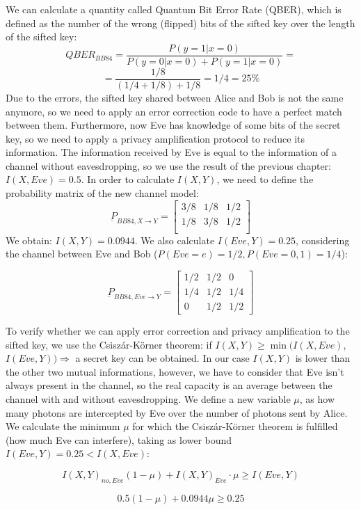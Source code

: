 \documentclass[journal, letterpaper]{IEEEtran}
\begin{document}
We can calculate a quantity called Quantum Bit Error Rate (QBER), which is defined as the number of the wrong (flipped) bits of the sifted key over the length of the sifted key: 
\[QBER_{BB84} = \frac{P(y=1|x=0)}{P(y=0|x=0)+P(y=1|x=0)}=\]
\[= \frac{1/8}{(1/4+1/8)+1/8} = 1/4 = 25\%\]
Due to the errors, the sifted key shared between Alice and Bob is not the same anymore, so we need to apply an error correction code to have a perfect match between them. Furthermore, now Eve has knowledge of some bits of the secret key, so we need to apply a privacy amplification protocol to reduce its information. The information received by Eve is equal to the information of a channel without eavesdropping, so we use the result of the previous chapter: $I(X,Eve) = 0.5$. In order to calculate $I(X,Y)$, we need to define the probability matrix of the new channel model: 
\[\underbar{P}_{BB84,X\rightarrow Y} = \begin{bmatrix}
    3/8 & 1/8 & 1/2\\
    1/8 & 3/8 &  1/2 \\
\end{bmatrix}\] 
We obtain: $I(X,Y) = 0.0944$. We also calculate $I(Eve,Y) = 0.25$, considering the channel between Eve and Bob ($P(Eve=e)=1/2, P(Eve=0,1)= 1/4$): 

\[\underbar{P}_{BB84,Eve\rightarrow Y} = \begin{bmatrix}
    1/2 & 1/2 & 0\\
    1/4 & 1/2 &  1/4 \\
    0 & 1/2 & 1/2
\end{bmatrix}\] 

To verify whether we can apply error correction and privacy amplification to the sifted key, we use the Csiszár-Körner theorem\cite{cryptoreview,korner}: if $I(X,Y)\geq \min(I(X,Eve)$, $I(Eve,Y)) \Rightarrow$ a secret key can be obtained. In our case $I(X,Y)$ is lower than the other two mutual informations, however, we have to consider that Eve isn't always present in the channel, so the real capacity is an average between the channel with and without eavesdropping. We define a new variable $\mu$, as how many photons are intercepted by Eve over the number of photons sent by Alice. We calculate the minimum $\mu$ for which the Csiszár-Körner theorem is fulfilled (how much Eve can interfere), taking as lower bound $I(Eve,Y)=0.25<I(X,Eve)$: 

\[I(X,Y)_{no,Eve}(1-\mu)+I(X,Y)_{Eve}\cdot\mu \geq I(Eve,Y)\]

\[0.5(1-\mu)+0.0944\mu \geq 0.25\]
\end{document}
